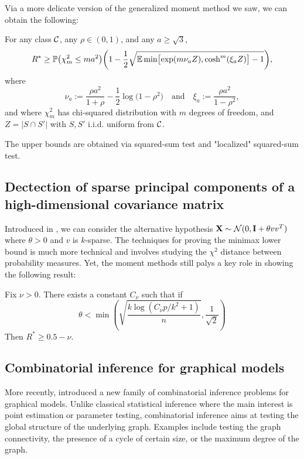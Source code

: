 \documentclass[10pt, oneside]{article}
\begin{document}
Via a more delicate version of the generalized moment method we saw, we can obtain the following:
\begin{prop}
  For any class ${\mathcal C}$, any $\rho\in(0, 1)$, and any $a \ge\sqrt{3}$,
  \begin{equation}
  \label{lower} R^* \geq\mathbb{P} \bigl(\chi_m^2 \le m
  a^2 \bigr) \biggl(1 - \frac{1}2 \sqrt{\mathbb{E}\min \bigl[\exp (m
  \nu_a Z ), \cosh^m(\xi_a Z) \bigr] - 1}
  \biggr),
  \end{equation}
  where
  \[
  \nu_a := \frac{\rho a^2}{1+\rho} - \frac{1}2 \log\bigl(1-
  \rho^2\bigr)\quad  \mbox{and}\quad  \xi_a := \frac{\rho a^2}{1-\rho^2},
  \]
  and where $\chi_m^2$ has chi-squared distribution with $m$ degrees of
  freedom, and $Z=|S \cap S'|$ with $S, S'$ i.i.d. uniform from ${\mathcal C}$.
\end{prop}
The upper bounds are obtained via squared-sum test and "localized" squared-sum test. 

\subsection{Dectection of sparse principal components of a high-dimensional covariance matrix}
Introduced in \cite{berthet2013optimal}, we can consider the alternative hypothesis $\mathbf{X} \sim {\mathcal N}(0, \mathbf{I} + \theta v v^T)$ where $\theta >0$ and $v$ is $k$-sparse. The techniques for proving the minimax lower bound is much more technical and involves studying the $\chi^2$ distance between probability measures. Yet, the moment methods still palys a key role in showing the following result:
\begin{prop}
  Fix $\nu > 0$. There exists a constant $C_{\nu}$ such that if 
  $$\theta < \min(\sqrt{\frac{k \log(C_{\nu}p/k^2 + 1)}{n}}, \frac{1}{\sqrt{2}})$$
  Then
  $R^* \ge 0.5 - \nu$.
\end{prop}

\subsection{Combinatorial inference for graphical models}

More recently, \cite{neykov2019combinatorial} introduced a new family of combinatorial inference problems for graphical models. Unlike classical statistical inference where the main interest is point estimation or parameter testing, combinatorial inference aims at testing the global structure of the underlying graph. Examples include testing the graph connectivity, the presence of a cycle of certain size, or the maximum degree of the graph.
\end{document}
